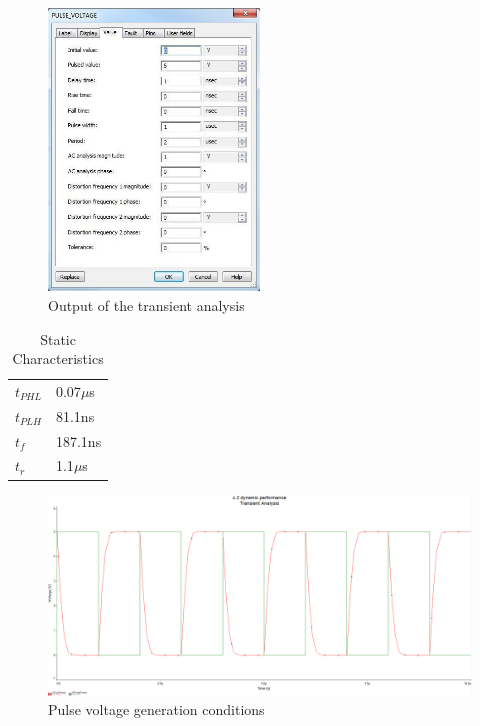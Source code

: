 \documentclass[12pt]{article}
\begin{document}
\begin{figure}[H]
\centering
\includegraphics[width=0.5\textwidth]{8.jpg}
\caption{Output of the transient analysis}
\end{figure}

\begin{table}[H]
\centering
\begin{tabular}{ll}
$t_{PHL}$ & 0.07$\mu$s\\
$t_{PLH}$ & 81.1ns \\
$t_{f}$ & 187.1ns \\
$t_{r}$ & 1.1$\mu$s
\end{tabular}
\caption{Static Characteristics}
\end{table}

\begin{figure}[H]
\centering
\includegraphics[width=1\textwidth]{c25.PNG}
\caption{Pulse voltage generation conditions}
\end{figure}
\end{document}
